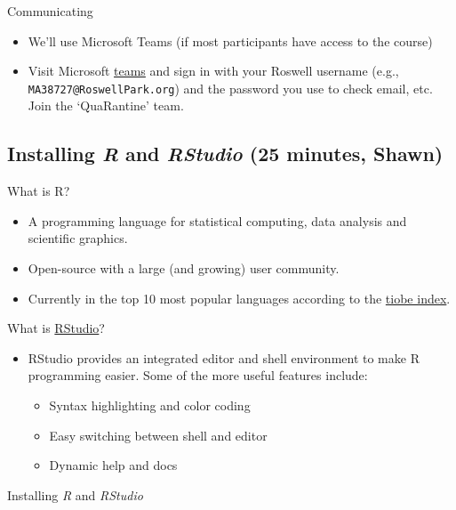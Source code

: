 \documentclass[]{book}
\providecommand{\tightlist}{%
  \setlength{\itemsep}{0pt}\setlength{\parskip}{0pt}}
\begin{document}
Communicating

\begin{itemize}
\tightlist
\item
  We'll use Microsoft Teams (if most participants have access to the course)
\item
  Visit Microsoft \href{https://teams.microsoft.org}{teams} and sign in with your Roswell username (e.g., \texttt{MA38727@RoswellPark.org}) and the password you use to check email, etc. Join the `QuaRantine' team.
\end{itemize}

\hypertarget{installing-r-and-rstudio-25-minutes-shawn}{%
\subsection{\texorpdfstring{Installing \emph{R} and \emph{RStudio} (25 minutes, Shawn)}{Installing R and RStudio (25 minutes, Shawn)}}\label{installing-r-and-rstudio-25-minutes-shawn}}

What is R?

\begin{itemize}
\item
  A programming language for statistical computing, data analysis and scientific graphics.
\item
  Open-source with a large (and growing) user community.
\item
  Currently in the top 10 most popular languages according to the \href{https://www.tiobe.com/tiobe-index/}{tiobe index}.
\end{itemize}

What is \href{https://rstudio.com/}{RStudio}?

\begin{itemize}
\tightlist
\item
  RStudio provides an integrated editor and shell environment to make R programming easier. Some of the more useful features include:

  \begin{itemize}
  \tightlist
  \item
    Syntax highlighting and color coding
  \item
    Easy switching between shell and editor
  \item
    Dynamic help and docs
  \end{itemize}
\end{itemize}

Installing \emph{R} and \emph{RStudio}
\end{document}
